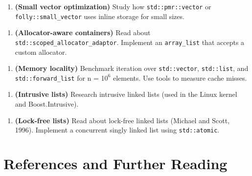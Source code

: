 \begin{enumerate}
\item \textbf{(Small vector optimization)} Study how \texttt{std::pmr::vector} or \texttt{folly::small\_vector} uses inline storage for small sizes.
\end{enumerate}

\begin{enumerate}
\item \textbf{(Allocator-aware containers)} Read about \texttt{std::scoped\_allocator\_adaptor}. Implement an \texttt{array\_list} that accepts a custom allocator.
\end{enumerate}

\begin{enumerate}
\item \textbf{(Memory locality)} Benchmark iteration over \texttt{std::vector}, \texttt{std::list}, and \texttt{std::forward\_list} for n = 1$0^{6}$ elements. Use tools to measure cache misses.
\end{enumerate}

\begin{enumerate}
\item \textbf{(Intrusive lists)} Research intrusive linked lists (used in the Linux kernel and Boost.Intrusive).
\end{enumerate}

\begin{enumerate}
\item \textbf{(Lock-free lists)} Read about lock-free linked lists (Michael and Scott, 1996). Implement a concurrent singly linked list using \texttt{std::atomic}.
\end{enumerate}

\section{References and Further Reading}

